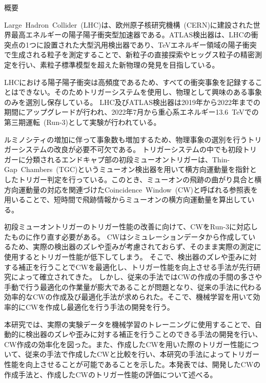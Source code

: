 \begin{center}
\begin{huge}
概要
\end{huge}
\end{center}

\vspace{10pt}

Large~Hadron~Collider~(LHC)は、欧州原子核研究機構~(CERN)に建設された世界最高エネルギーの陽子陽子衝突型加速器である。ATLAS検出器は、LHCの衝突点の1つに設置された大型汎用検出器であり、TeVエネルギー領域の陽子衝突で生成される粒子を測定することで、新粒子の直接探索やヒッグス粒子の精密測定を行い、素粒子標準模型を超えた新物理の発見を目指している。

LHCにおける陽子陽子衝突は高頻度であるため、すべての衝突事象を記録することはできない。そのためトリガーシステムを使用し、物理として興味のある事象のみを選別し保存している。
LHC及びATLAS検出器は2019年から2022年までの期間にアップグレードが行われ、2022年7月から重心系エネルギー13.6~TeVでの第三期運転~(Run-3)として実験が行われている。

ルミノシティの増加に伴って事象数も増加するため、物理事象の選別を行うトリガーシステムの改良が必要不可欠である。
トリガーシステムの中でも初段トリガーに分類されるエンドキャプ部の初段ミューオントリガーは、Thin-Gap~Chambers~(TGC)というミューオン検出器を用いて横方向運動量を指針としたトリガー判定を行っている。このとき、ミューオンの飛跡の曲がり具合と横方向運動量の対応を関連づけたCoincidence~Window~(CW)と呼ばれる参照表を用いることで、短時間で飛跡情報からミューオンの横方向運動量を算出している。

初段ミューオントリガーのトリガー性能の改善に向けて、CWをRun-3に対応したものに作り直す必要がある。
CWはシミュレーションデータから作成しているため、実際の検出器のズレや歪みが考慮されておらず、そのまま実際の測定に使用するとトリガー性能が低下してしまう。
そこで、検出器のズレや歪みに対する補正を行うことでCWを最適化し、トリガー性能を向上させる手法が先行研究によって確立されてきた。
しかし、従来の手法ではCWの作成の手間の多さや手動で行う最適化の作業量が膨大であることが問題となり、従来の手法に代わる効率的なCWの作成及び最適化手法が求められた。そこで、機械学習を用いて効率的にCWを作成し最適化を行う手法の開発を行う。

本研究では、実際の実験データを機械学習のトレーニングに使用することで、自動的に検出器のズレや歪みに対する補正を行うことのできる手法の開発を行い、CW作成の効率化を図った。また、作成したCWを用いた際のトリガー性能について、従来の手法で作成したCWと比較を行い、本研究の手法によってトリガー性能を向上させることが可能であることを示した。本発表では、開発したCWの作成手法と、作成したCWのトリガー性能の評価について述べる。